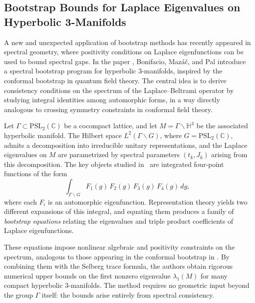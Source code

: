 \documentclass[11pt]{article}
\theoremstyle{plain}
\begin{document}
\medskip


\label{sec:eigenfunction-bootstrap}



\subsection{Bootstrap Bounds for Laplace Eigenvalues on Hyperbolic 3-Manifolds}


A new and unexpected application of bootstrap methods has recently appeared in spectral geometry, where positivity conditions on Laplace eigenfunctions can be used to bound spectral gaps. In the paper \cite{BonMazPal}, Bonifacio,  Mazáč, and  Pal   introduce a
spectral bootstrap program for hyperbolic $3$-manifolds, inspired by the conformal
bootstrap in quantum field theory.  
The central idea is to derive consistency conditions on the spectrum of the
Laplace--Beltrami operator by studying integral identities among automorphic forms,
in a way directly analogous to crossing symmetry constraints in conformal field theory.

\medskip

Let $\Gamma \subset \mathrm{PSL}_2(\mathbb{C})$ be a cocompact lattice, and let
$M = \Gamma \backslash \mathbb{H}^3$ be the associated hyperbolic manifold.
The Hilbert space $L^2(\Gamma\backslash G)$, where $G = \mathrm{PSL}_2(\mathbb{C})$,
admits a decomposition into irreducible unitary representations, and the Laplace
eigenvalues on $M$ are parametrized by spectral parameters $(t_k, J_k)$ arising
from this decomposition.  The key objects studied in~\cite{BonMazPal}
are integrated four-point functions of the form
\[
\int_{\Gamma \backslash G}
F_1(g)\, F_2(g)\, F_3(g)\, F_4(g)\, dg,
\]
where each $F_i$ is an automorphic eigenfunction.  Representation theory yields
two different expansions of this integral, and equating them produces a family of
\emph{bootstrap equations} relating the eigenvalues and triple product coefficients
of Laplace eigenfunctions.

\medskip

These equations impose nonlinear algebraic and positivity constraints on the
spectrum, analogous to those appearing in the conformal bootstrap in \cite{BPZ1984,RRTV}.  
By combining them with the Selberg trace formula, the authors obtain rigorous numerical upper
bounds on the first nonzero eigenvalue $\lambda_1(M)$ for many compact
hyperbolic $3$-manifolds.  The method requires no geometric input beyond the
group $\Gamma$ itself: the bounds arise entirely from spectral consistency.
\end{document}
